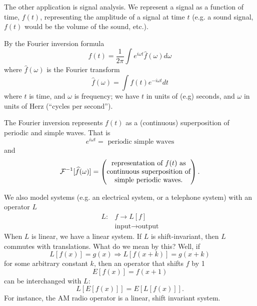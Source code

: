 The other application is signal analysis. We represent a
signal as a function of time, $f(t)$, representing the
amplitude of a signal at time $t$ (e.g. a sound signal,
$f(t)$ would be the volume of the sound, etc.).

By the Fourier inversion formula
\begin{equation}
f(t) = \frac{1}{2\pi}\int e^{i\omega
  t}\widehat{f}(\omega)d\omega
\end{equation}
where $\widehat{f}(\omega)$ is the Fourier transform
\begin{equation}
\widehat{f}(\omega) = \int f(t)e^{-i\omega t}dt
\end{equation}
where $t$ is time, and $\omega$ is frequency; we have $t$ in
units of (e.g) seconds, and $\omega$ in units of Herz
(``cycles per second'').

The Fourier inversion represents $f(t)$ as a (continuous) superposition
of periodic and simple waves. That is
\begin{equation}
e^{i\omega t} = \text{ periodic simple waves}
\end{equation}
and
\begin{equation}
\mathcal{F}^{-1}[\widehat{f}(\omega)] = \begin{pmatrix}
$representation$\ $of$\ f(t)\ $as$\\
$continuous$\ $superposition$\ $of$\\
$simple$\ $periodic$\ $waves$.
\end{pmatrix}.
\end{equation}

We also model systems (e.g. an electrical system, or a
telephone system) with an operator $L$
\begin{align*}
L:&f\to L[f]\\
&\text{input}\to\text{output}
\end{align*}
When $L$ is linear, we have a linear system. If $L$ is
shift-invariant, then $L$ commutes with translations. What
do we mean by this? Well, if
\begin{equation}
L[f(x)]=g(x)\Rightarrow L[f(x+k)] = g(x+k)
\end{equation}
for some arbitrary constant $k$, then an operator that
shifts $f$ by 1
\begin{equation}
E[f(x)] = f(x+1)
\end{equation}
can be interchanged with $L$:
\begin{equation}
L[E[f(x)]]=E[L[f(x)]].
\end{equation}
For instance, the AM radio operator is a linear, shift
invariant system. 
